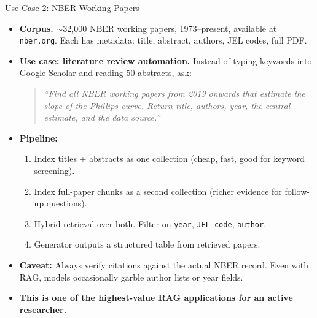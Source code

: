 \documentclass[10pt,english,aspectratio=169]{beamer}
\begin{document}
\begin{frame}{Use Case 2: NBER Working Papers}
\begin{itemize}
\item \textbf{Corpus.} $\sim$32{,}000 NBER working papers, 1973--present, available at \texttt{nber.org}. Each has metadata: title, abstract, authors, JEL codes, full PDF.

\medskip
\item \textbf{Use case: literature review automation.} Instead of typing keywords into Google Scholar and reading 50 abstracts, ask:
\begin{quote}
\small\itshape
``Find all NBER working papers from 2019 onwards that estimate the slope of the Phillips curve. Return title, authors, year, the central estimate, and the data source.''
\end{quote}

\medskip
\item \textbf{Pipeline:}
\begin{enumerate}
    \item Index titles + abstracts as one collection (cheap, fast, good for keyword screening).
    \item Index full-paper chunks as a second collection (richer evidence for follow-up questions).
    \item Hybrid retrieval over both. Filter on \texttt{year}, \texttt{JEL\_code}, \texttt{author}.
    \item Generator outputs a structured table from retrieved papers.
\end{enumerate}

\medskip
\item \textbf{Caveat:} Always verify citations against the actual NBER record. Even with RAG, models occasionally garble author lists or year fields.

\medskip
\item \textbf{This is one of the highest-value RAG applications for an active researcher.}
\end{itemize}
\end{frame}
\end{document}

